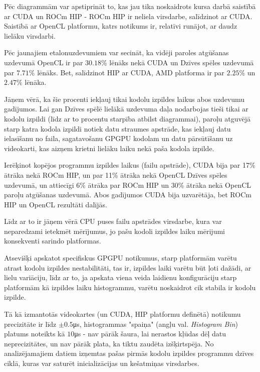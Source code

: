 Pēc diagrammām var apstiprināt to, kas jau tika noskaidrots kursa darbā
saistībā ar CUDA un ROCm HIP - ROCm HIP ir neliela virsdarbe, salīdzinot ar
CUDA.\cite{kursa-darbs} Saistībā ar OpenCL platformu, katrs notikums ir,
relatīvi runājot, ar daudz lielāku virsdarbi.

Pēc jaunajiem etalonuzdevumiem var secināt, ka vidēji paroles
atgūšanas uzdevumā OpenCL ir par \(30.18\%\) lēnāks nekā CUDA un Dzīves
spēles uzdevumā par \(7.71\%\) lēnāks. Bet, salīdzinot HIP ar CUDA,
AMD platforma ir par \(2.25\%\) un \(2.47\%\) lēnāka.

Jāņem vērā, ka šie procenti iekļauj tikai kodolu izpildes laikus abos uzdevumu
gadījumos. Lai gan Dzīves spēlē lielākā uzdevuma daļa nodarbojas tieši tikai ar
kodolu izpildi (līdz ar to procentu starpība atbilst diagrammai), paroļu
atguvējā starp katra kodola izpildi notiek datu straumes apstrāde, kas iekļauj
datu ielasīšanu no faila, sagatavošanu GPGPU kodolam un datu pārsūtīšanu uz
videokarti, kas aizņem krietni lielāku laiku nekā paša kodola izpilde.

Ierēķinot kopējos programmu izpildes laikus (failu apstrāde), CUDA bija par
17\% ātrāka nekā ROCm HIP, un par 11\% ātrāka nekā OpenCL Dzīves spēles
uzdevumā, un attiecīgi 6\% ātrāka par ROCm HIP un 30\% ātrāka nekā OpenCL
paroļu atgūšanas uzdevumā. Abos gadījumos CUDA bija uzvarētāja, bet ROCm HIP un
OpenCL rezultāti dalījās.

Līdz ar to ir jāņem vērā CPU puses failu apstrādes virsdarbe, kura var
neparedzami ietekmēt mērījumus, jo pašu kodoli izpildes laiku mērijumi
konsekventi sarindo platformas.

Atsevišķi apskatot specifiskus GPGPU notikumus, starp platformām varētu atrast
kodolu izpildes nestabilitāti, tas ir, izpildes laiki varētu būt ļoti dažādi,
ar lielu variāciju, līdz ar to, ja apskata viena veida laidienu konfigurāciju
starp platformām kā izpildes laiku histogrammu, varētu noskaidrot cik stabila
ir kodolu izpilde.

Tā kā izmantotās videokartes (un CUDA, HIP platformu definētā) notikumu
precizitāte ir līdz \(\pm0.5\)\si{\micro\second}, histogrammas "spaiņa" (angļu
val. \textit{Histogram Bin}) platums noteikts kā \(10\)\si{\micro\second} - nav
pārāk šaura, lai nerastos kļūdas dēļ datu neprecizitātes, un nav pārāk plata, 
ka tiktu zaudēta izšķirtspēja. \cite{Freedman1981} No analizējamajiem datiem
izņemtas pašas pirmās kodolu izpildes programmu dzīves ciklā, kuras var saturēt
inicializācijas un kešatmiņas virsdarbes.

